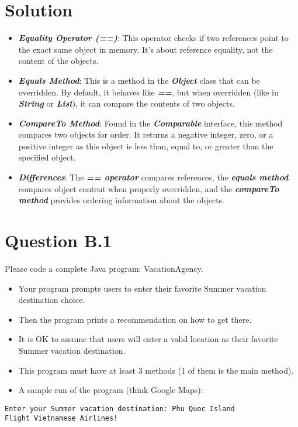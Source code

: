 \documentclass[12pt]{article}
\begin{document}
\section*{Solution}
\begin{itemize}
  \item \textbf{\textit{Equality Operator (==)}}: This operator checks if two references point to the exact same object in memory. It's about reference equality, not the content of the objects.
  \item \textbf{\textit{Equals Method}}: This is a method in the \textbf{\textit{Object}} class that can be overridden. By default, it behaves like \textbf{\textit{==}}, but when overridden (like in \textbf{\textit{String}} or \textbf{\textit{List}}), it can compare the contents of two objects.
  \item \textbf{\textit{CompareTo Method}}: Found in the \textbf{\textit{Comparable}} interface, this method compares two objects for order. It returns a negative integer, zero, or a positive integer as this object is less than, equal to, or greater than the specified object.
  \item \textbf{\textit{Differences}}: The \textbf{\textit{== operator}} compares references, the \textbf{\textit{equals method}} compares object content when properly overridden, and the \textbf{\textit{compareTo method}} provides ordering information about the objects.
\end{itemize}

\newpage

\section*{Question B.1}
Please code a complete Java program: VacationAgency.
\begin{itemize}
  \item Your program prompts users to enter their favorite Summer vacation destination choice.
  \item Then the program prints a recommendation on how to get there.
  \item It is OK to assume that users will enter a valid location as their favorite Summer vacation destination.
  \item This program must have at least 3 methods (1 of them is the main method).
  \item A sample run of the program (think Google Maps):
\end{itemize}
\texttt{Enter your Summer vacation destination: Phu Quoc Island \\
  Flight Vietnamese Airlines!}
\end{document}
